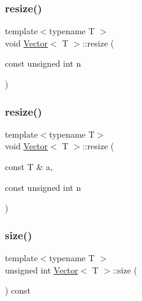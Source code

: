 \subsubsection{\texorpdfstring{resize()}{resize()}\hspace{0.1cm}{\footnotesize\ttfamily [1/2]}}
{\footnotesize\ttfamily template$<$typename T $>$ \\
void \mbox{\hyperlink{classVector}{Vector}}$<$ T $>$\+::resize (\begin{DoxyParamCaption}\item[{const unsigned int}]{n }\end{DoxyParamCaption})\hspace{0.3cm}{\ttfamily [inline]}}

\mbox{\label{classVector_a1ff5ed0bca47854450eb78024c6f52ff_a1ff5ed0bca47854450eb78024c6f52ff}} 
\subsubsection{\texorpdfstring{resize()}{resize()}\hspace{0.1cm}{\footnotesize\ttfamily [2/2]}}
{\footnotesize\ttfamily template$<$typename T$>$ \\
void \mbox{\hyperlink{classVector}{Vector}}$<$ T $>$\+::resize (\begin{DoxyParamCaption}\item[{const T \&}]{a,  }\item[{const unsigned int}]{n }\end{DoxyParamCaption})\hspace{0.3cm}{\ttfamily [inline]}}

\mbox{\label{classVector_a5214a382564aedc712b609416aa3b7b1_a5214a382564aedc712b609416aa3b7b1}} 
\subsubsection{\texorpdfstring{size()}{size()}}
{\footnotesize\ttfamily template$<$typename T $>$ \\
unsigned int \mbox{\hyperlink{classVector}{Vector}}$<$ T $>$\+::size (\begin{DoxyParamCaption}{ }\end{DoxyParamCaption}) const\hspace{0.3cm}{\ttfamily [inline]}}



